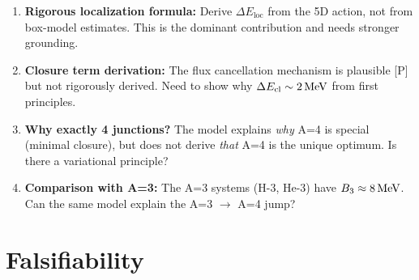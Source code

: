 \begin{edcopenbox}[title=Open Problems]
    \begin{enumerate}
        \item \textbf{Rigorous localization formula:} Derive
              $\Delta E_{\text{loc}}$ from the 5D action, not from
              box-model estimates. This is the dominant contribution and
              needs stronger grounding.

        \item \textbf{Closure term derivation:} The flux cancellation
              mechanism is plausible [P] but not rigorously derived.
              Need to show why $\Delta E_{\text{cl}} \sim 2\,\mathrm{MeV}$ from
              first principles.

        \item \textbf{Why exactly 4 junctions?} The model explains
              \emph{why} A=4 is special (minimal closure), but does not
              derive \emph{that} A=4 is the unique optimum. Is there a
              variational principle?

        \item \textbf{Comparison with A=3:} The A=3 systems (H-3, He-3)
              have $B_3 \approx 8\,\mathrm{MeV}$. Can the same model explain
              the A=3 $\to$ A=4 jump?
    \end{enumerate}
    \tagOpen
\end{edcopenbox}

\section{Falsifiability}
\label{sec:he4:falsify}

